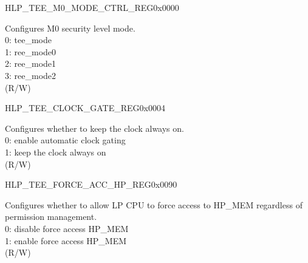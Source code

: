 \begin{register}{H}{LP\_TEE\_M0\_MODE\_CTRL\_REG}{0x0000}\label{regdesc:LPTEEM0MODECTRLREG}
%
%
\regnewline%
\begin{regdesc}\begin{reglist}
\label{fielddesc:LPTEEM0MODE}\item [LP\_TEE\_M0\_MODE] Configures M0 security level mode.\\ 
0: tee\_mode \\ 
1: ree\_mode0 \\ 
2: ree\_mode1 \\ 
3: ree\_mode2  \\ (R/W)
\end{reglist}\end{regdesc}
\end{register}


\begin{register}{H}{LP\_TEE\_CLOCK\_GATE\_REG}{0x0004}\label{regdesc:LPTEECLOCKGATEREG}
%
%
\regnewline%
\begin{regdesc}\begin{reglist}
\label{fielddesc:LPTEECLKEN}\item [LP\_TEE\_CLK\_EN] Configures whether to keep the clock always on.\\ 
0: enable automatic clock gating \\ 
1: keep the clock always on  \\ (R/W)
\end{reglist}\end{regdesc}
\end{register}


\begin{register}{H}{LP\_TEE\_FORCE\_ACC\_HP\_REG}{0x0090}\label{regdesc:LPTEEFORCEACCHPREG}
%
%
\regnewline%
\begin{regdesc}\begin{reglist}
\label{fielddesc:LPTEEFORCEACCHPMEMEN}\item [LP\_TEE\_FORCE\_ACC\_HPMEM\_EN] Configures whether to allow LP CPU to force access to HP\_MEM regardless of permission management.\\ 
0: disable force access HP\_MEM \\ 
1: enable force access HP\_MEM  \\ (R/W)
\end{reglist}\end{regdesc}
\end{register}


